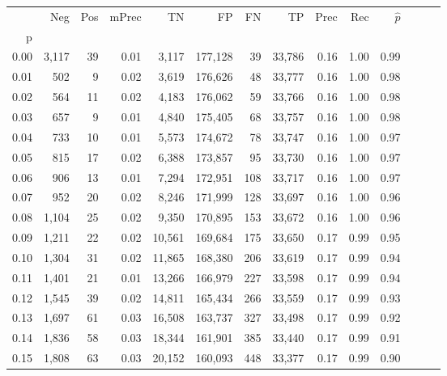 \begin{tabular}{rrrrrrrrrrrrrr}
\toprule
{} &    Neg &  Pos & mPrec &       TN &       FP &      FN &      TP &  Prec &   Rec & $\hat{p}$ \\
p    &        &      &       &          &          &         &         &       &       &           \\
\midrule
0.00 &  3,117 &   39 &  0.01 &    3,117 &  177,128 &      39 &  33,786 &  0.16 &  1.00 &      0.99 \\
0.01 &    502 &    9 &  0.02 &    3,619 &  176,626 &      48 &  33,777 &  0.16 &  1.00 &      0.98 \\
0.02 &    564 &   11 &  0.02 &    4,183 &  176,062 &      59 &  33,766 &  0.16 &  1.00 &      0.98 \\
0.03 &    657 &    9 &  0.01 &    4,840 &  175,405 &      68 &  33,757 &  0.16 &  1.00 &      0.98 \\
0.04 &    733 &   10 &  0.01 &    5,573 &  174,672 &      78 &  33,747 &  0.16 &  1.00 &      0.97 \\
0.05 &    815 &   17 &  0.02 &    6,388 &  173,857 &      95 &  33,730 &  0.16 &  1.00 &      0.97 \\
0.06 &    906 &   13 &  0.01 &    7,294 &  172,951 &     108 &  33,717 &  0.16 &  1.00 &      0.97 \\
0.07 &    952 &   20 &  0.02 &    8,246 &  171,999 &     128 &  33,697 &  0.16 &  1.00 &      0.96 \\
0.08 &  1,104 &   25 &  0.02 &    9,350 &  170,895 &     153 &  33,672 &  0.16 &  1.00 &      0.96 \\
0.09 &  1,211 &   22 &  0.02 &   10,561 &  169,684 &     175 &  33,650 &  0.17 &  0.99 &      0.95 \\
0.10 &  1,304 &   31 &  0.02 &   11,865 &  168,380 &     206 &  33,619 &  0.17 &  0.99 &      0.94 \\
0.11 &  1,401 &   21 &  0.01 &   13,266 &  166,979 &     227 &  33,598 &  0.17 &  0.99 &      0.94 \\
0.12 &  1,545 &   39 &  0.02 &   14,811 &  165,434 &     266 &  33,559 &  0.17 &  0.99 &      0.93 \\
0.13 &  1,697 &   61 &  0.03 &   16,508 &  163,737 &     327 &  33,498 &  0.17 &  0.99 &      0.92 \\
0.14 &  1,836 &   58 &  0.03 &   18,344 &  161,901 &     385 &  33,440 &  0.17 &  0.99 &      0.91 \\
0.15 &  1,808 &   63 &  0.03 &   20,152 &  160,093 &     448 &  33,377 &  0.17 &  0.99 &      0.90 \\

\end{tabular}
